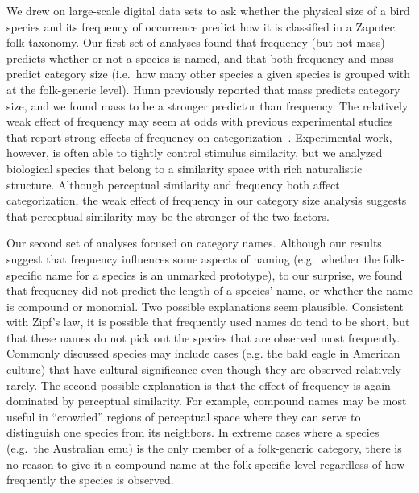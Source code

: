 \documentclass[10pt,letterpaper]{article}
\begin{document}
We drew on large-scale digital data sets to ask whether the physical size of a bird species and its frequency of occurrence predict how it is classified in a Zapotec folk taxonomy.  Our first set of analyses found that frequency (but not mass) predicts whether or not a species is named, and that both frequency and mass predict category size (i.e.\ how many other species a given species is grouped with at the folk-generic level). Hunn previously reported that mass predicts category size, and we found mass to be a stronger predictor than frequency. The relatively weak effect of frequency may seem at odds with previous experimental studies that report strong effects of frequency on categorization~\cite{}. Experimental work, however, is often able to tightly control stimulus similarity, but we analyzed biological species that belong to a similarity space with rich naturalistic structure. Although perceptual similarity and frequency both affect categorization, the weak effect of frequency in our category size analysis suggests that perceptual similarity may be the stronger of the two factors.  


Our second set of analyses focused on category names. Although our results suggest that frequency influences some aspects of naming (e.g.\ whether the folk-specific name for a species is an unmarked prototype), to our surprise, we found that frequency did not predict the length of a species' name, or whether the name is compound or monomial. Two possible explanations seem plausible. Consistent with Zipf's law, it is possible that frequently used names do tend to be short, but that these names do not pick out the species that are observed most frequently. Commonly discussed species may include cases (e.g. the bald eagle in American culture) that have cultural significance even though they are observed relatively rarely. The second possible explanation is that the effect of frequency is again dominated by perceptual similarity. For example, compound names may be most useful in ``crowded'' regions of perceptual space where they can serve to distinguish one species from its neighbors. In extreme cases where a species (e.g.\ the Australian emu) is the only member of a folk-generic category, there is no reason to give it a compound name at the folk-specific level regardless of how frequently the species is observed. 
\end{document}
